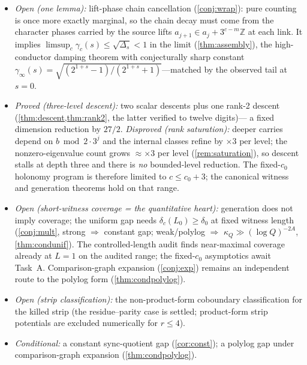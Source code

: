 \documentclass[11pt]{article}
\newcommand{\Z}{\mathbb{Z}}
\theoremstyle{plain}
\theoremstyle{definition}
\theoremstyle{remark}
\begin{document}
\begin{itemize}[leftmargin=1.6em,itemsep=1pt]
$\operatorname{Col}_m(c)\le\mathrm{poly}(c)\,3^{-c}$ at $m\ge(1+\varepsilon)c$
(\cref{lem:flat}; measured $3^c\operatorname{Col}\approx2$): the deep digits of
the window variable determine the suffix exactly (no wrapping of partial sums
beyond scale $O(\log c)$). This is the renewal-flattening half of the wrap
conjecture, in collision form.
\item \emph{Open (one lemma):} lift-phase chain cancellation
(\cref{conj:wrap}): pure counting is once more exactly marginal, so the chain
decay must come from the character phases carried by the source lifts
$a_{j+1}\in a_j+3^{c-m}\Z$ at each link. It implies
$\limsup_c\gamma_c(s)\le\sqrt{\Delta_s}<1$ in the limit (\cref{thm:assembly}),
the high-conductor damping theorem with conjecturally sharp constant
$\gamma_\infty(s)=\sqrt{(2^{1+s}-1)/(2^{1+s}+1)}$---matched by the observed
tail at $s=0$.
\item \emph{Proved (three-level descent):} two scalar descents plus one rank-2
descent (\cref{thm:descent,thm:rank2}, the latter verified to twelve digits)---%
a fixed dimension reduction by $27/2$. \emph{Disproved (rank saturation):}
deeper carries depend on $b\bmod2\cdot3^j$ and the internal classes refine by
$\times3$ per level; the nonzero-eigenvalue count grows $\approx\times3$ per
level (\cref{rem:saturation}), so descent stalls at depth three and there is
\emph{no} bounded-level reduction. The fixed-$c_0$ holonomy program is
therefore limited to $c\le c_0+3$; the canonical witness and generation
theorems hold on that range.
\item \emph{Open (short-witness coverage = the quantitative heart):} generation
does not imply coverage; the uniform gap needs $\delta_c(L_0)\ge\delta_0$ at
fixed witness length (\cref{conj:mult}, strong $\Rightarrow$ constant gap;
weak/polylog $\Rightarrow$ $\kappa_Q\gg(\log Q)^{-2A}$, \cref{thm:condunif}).
The controlled-length audit finds near-maximal coverage already at $L=1$ on the
audited range; the fixed-$c_0$ asymptotics await Task~A. Comparison-graph
expansion (\cref{conj:exp}) remains an independent route to the polylog form
(\cref{thm:condpolylog}).
\item \emph{Open (strip classification):} the non-product-form coboundary
classification for the killed strip (the residue--parity case is settled;
product-form strip potentials are excluded numerically for $r\le4$).
\item \emph{Conditional:} a constant sync-quotient gap (\cref{cor:const});
a polylog gap under comparison-graph expansion (\cref{thm:condpolylog}).
\end{itemize}
\end{document}
